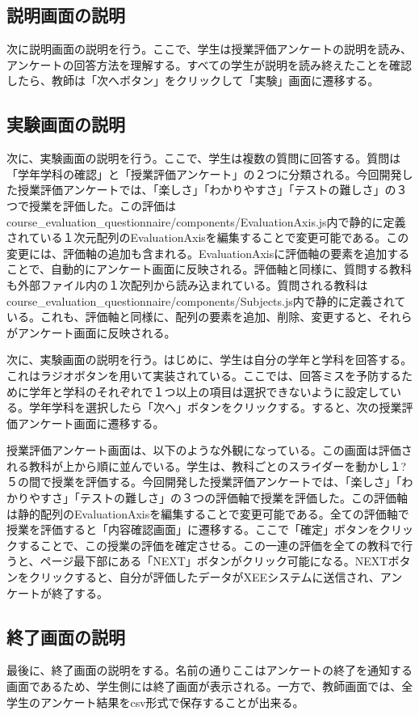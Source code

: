 \documentclass[11pt,a4paper]{jsarticle}
\begin{document}
\subsection{説明画面の説明}
次に説明画面の説明を行う。ここで、学生は授業評価アンケートの説明を読み、アンケートの回答方法を理解する。すべての学生が説明を読み終えたことを確認したら、教師は「次へボタン」をクリックして「実験」画面に遷移する。
\subsection{実験画面の説明}
次に、実験画面の説明を行う。ここで、学生は複数の質問に回答する。質問は「学年学科の確認」と「授業評価アンケート」の２つに分類される。今回開発した授業評価アンケートでは、「楽しさ」「わかりやすさ」「テストの難しさ」の３つで授業を評価した。この評価はcourse_evaluation_questionnaire/components/EvaluationAxis.js内で静的に定義されている１次元配列のEvaluationAxisを編集することで変更可能である。この変更には、評価軸の追加も含まれる。EvaluationAxisに評価軸の要素を追加することで、自動的にアンケート画面に反映される。評価軸と同様に、質問する教科も外部ファイル内の１次配列から読み込まれている。質問される教科はcourse_evaluation_questionnaire/components/Subjects.js内で静的に定義されている。これも、評価軸と同様に、配列の要素を追加、削除、変更すると、それらがアンケート画面に反映される。

次に、実験画面の説明を行う。はじめに、学生は自分の学年と学科を回答する。これはラジオボタンを用いて実装されている。ここでは、回答ミスを予防するために学年と学科のそれぞれで１つ以上の項目は選択できないように設定している。学年学科を選択したら「次へ」ボタンをクリックする。すると、次の授業評価アンケート画面に遷移する。

授業評価アンケート画面は、以下のような外観になっている。この画面は評価される教科が上から順に並んでいる。学生は、教科ごとのスライダーを動かし１?５の間で授業を評価する。今回開発した授業評価アンケートでは、「楽しさ」「わかりやすさ」「テストの難しさ」の３つの評価軸で授業を評価した。この評価軸は静的配列のEvaluationAxisを編集することで変更可能である。全ての評価軸で授業を評価すると「内容確認画面」に遷移する。ここで「確定」ボタンをクリックすることで、この授業の評価を確定させる。この一連の評価を全ての教科で行うと、ページ最下部にある「NEXT」ボタンがクリック可能になる。NEXTボタンをクリックすると、自分が評価したデータがXEEシステムに送信され、アンケートが終了する。

\subsection{終了画面の説明}
最後に、終了画面の説明をする。名前の通りここはアンケートの終了を通知する画面であるため、学生側には終了画面が表示される。一方で、教師画面では、全学生のアンケート結果をcsv形式で保存することが出来る。
\end{document}
